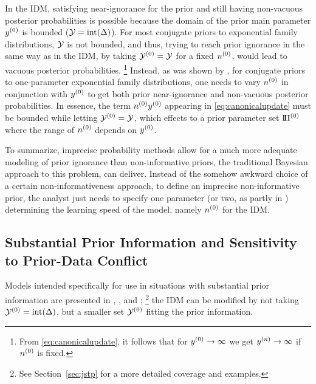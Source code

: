 In the IDM, satisfying near-ignorance for the prior and still having non-vacuous posterior probabilities is possible
because the domain of the prior main parameter $y^{(0)}$ is bounded ($\mathcal{Y} = \text{int}(\Delta)$).
For most conjugate priors to exponential family distributions, $\mathcal{Y}$ is not bounded,
and thus, trying to reach prior ignorance in the same way as in the IDM,
by taking $\mathcal{Y}^{(0)} = \mathcal{Y}$ for a fixed $n^{(0)}$, would lead to vacuous posterior probabilities.%
\footnote{From \eqref{eq:canonicalupdate}, it follows that for $y^{(0)} \rightarrow \infty$ we get $y^{(n)} \rightarrow \infty$ if $n^{(0)}$ is fixed.}
Instead, as was shown by \textcite{2012:benavolizaffalon}, for conjugate priors to one-parameter exponential family distributions,
one needs to vary $n^{(0)}$ in conjunction with $y^{(0)}$ to get both prior near-ignorance and non-vacuous posterior probabilities.
In essence, the term $n^{(0)} y^{(0)}$ appearing in \eqref{eq:canonicalupdate} must be bounded while letting $\mathcal{Y}^{(0)} = \mathcal{Y}$,
which effects to a prior parameter set $\text{I}\!\Pi^{(0)}$ where the range of $n^{(0)}$ depends on $y^{(0)}$.

To summarize, imprecise probability methods allow for a much more adequate modeling of prior ignorance
than non-informative priors, the traditional Bayesian approach to this problem, can deliver.
Instead of the somehow awkward choice of a certain non-informativeness approach,
to define an imprecise non-informative prior, the analyst just needs to specify one parameter
(or two, as partly in \cite{2012:benavolizaffalon})
determining the learning speed of the model, namely $n^{(0)}$ for the IDM.


\subsection{Substantial Prior Information and Sensitivity to Prior-Data Conflict}
\label{sec:pdc-sensitivity}

Models intended specifically for use in situations with substantial prior information are presented in
\textcite[footnote no.~10 in \S 1.1.4, and \S 7.8.3]{1991:walley}, \textcite{2005:quaeghebeurcooman}, and \textcite{Walter2009a};%
\footnote{See Section~\ref{sec:jstp} for a more detailed coverage and examples.}
the IDM can be modified by not taking $\mathcal{Y}^{(0)} = \text{int}(\Delta)$, but a smaller set $\mathcal{Y}^{(0)}$ fitting the prior information.

